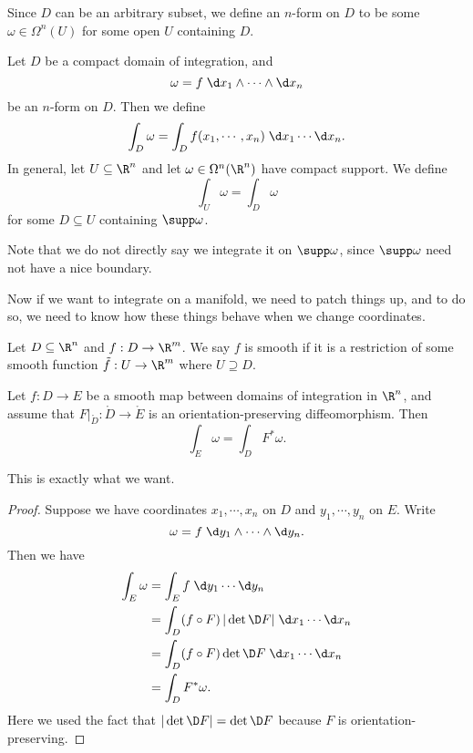 \documentclass[a4paper]{article}
\begin{document}
Since $D$ can be an arbitrary subset, we define an $n$-form on $D$ to be some $\omega \in \Omega^n(U)$ for some open $U$ containing $D$.

\begin{defi}[Integration on $\R^n$]
  Let $D$ be a compact domain of integration, and
  \[
    \omega = f\; \d x_1 \wedge \cdots \wedge \d x_n
  \]
  be an $n$-form on $D$. Then we define
  \[
    \int_D \omega = \int_D f(x_1, \cdots, x_n) \;\d x_1 \cdots \d x_n.
  \]
  In general, let $U \subseteq \R^n$ and let $\omega \in \Omega^n(\R^n)$ have compact support. We define
  \[
    \int_U \omega = \int_D \omega
  \]
  for some $D\subseteq U$ containing $\supp \omega$.
\end{defi}
Note that we do not directly say we integrate it on $\supp \omega$, since $\supp \omega$ need not have a nice boundary.

Now if we want to integrate on a manifold, we need to patch things up, and to do so, we need to know how these things behave when we change coordinates.

\begin{defi}
  Let $D \subseteq \R^n$ and $f: D \to \R^m$. We say $f$ is smooth if it is a restriction of some smooth function $\tilde{f}: U \to \R^m$ where $U \supseteq D$.
\end{defi}

\begin{lemma}
  Let $f: D \to E$ be a smooth map between domains of integration in $\R^n$, and assume that $F|_{\mathring{D}}: \mathring{D} \to \mathring{E}$ is an orientation-preserving diffeomorphism. Then
  \[
    \int_E \omega = \int_D F^* \omega.
  \]
\end{lemma}
This is exactly what we want.

\begin{proof}
  Suppose we have coordinates $x_1, \cdots, x_n$ on $D$ and $y_1, \cdots, y_n$ on $E$. Write
  \[
    \omega = f\;\d y_1 \wedge \cdots \wedge \d y_n.
  \]
  Then we have
  \begin{align*}
    \int_E \omega &= \int_E f\;\d y_1 \cdots \d y_n\\
    &= \int_D (f \circ F)\, |\det \D F|\;\d x_1 \cdots \d x_n\\
    &= \int_D (f \circ F) \det \D F \; \d x_1 \cdots \d x_n\\
    &= \int_D F^* \omega.
  \end{align*}
  Here we used the fact that $|\det \D F| = \det \D F$ because $F$ is orientation-preserving.
\end{proof}
\end{document}

